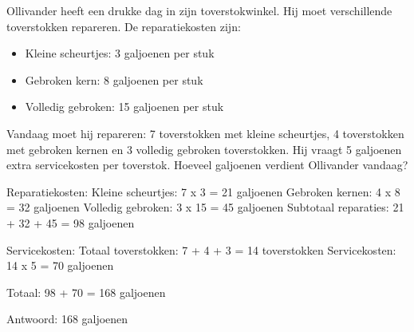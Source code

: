 \begin{opgave}
Ollivander heeft een drukke dag in zijn toverstokwinkel. Hij moet verschillende
toverstokken repareren. De reparatiekosten zijn:

\begin{itemize}
\item Kleine scheurtjes: 3 galjoenen per stuk
\item Gebroken kern: 8 galjoenen per stuk
\item Volledig gebroken: 15 galjoenen per stuk
\end{itemize}

Vandaag moet hij repareren: 7 toverstokken met kleine scheurtjes, 4 toverstokken
met gebroken kernen en 3 volledig gebroken toverstokken. Hij vraagt 5 galjoenen
extra servicekosten per toverstok. Hoeveel galjoenen verdient Ollivander vandaag?
\end{opgave}

\begin{oplossing}
Reparatiekosten:
Kleine scheurtjes: 7 x 3 = 21 galjoenen
Gebroken kernen: 4 x 8 = 32 galjoenen
Volledig gebroken: 3 x 15 = 45 galjoenen
Subtotaal reparaties: 21 + 32 + 45 = 98 galjoenen

Servicekosten:
Totaal toverstokken: 7 + 4 + 3 = 14 toverstokken
Servicekosten: 14 x 5 = 70 galjoenen

Totaal: 98 + 70 = 168 galjoenen

Antwoord: 168 galjoenen
\end{oplossing}